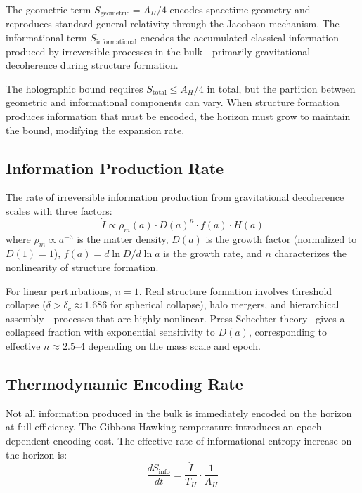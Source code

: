 \documentclass[twocolumn,superscriptaddress,prl,amsmath,amssymb]{revtex4-2}
\begin{document}
The geometric term $S_\text{geometric} = A_H/4$ encodes spacetime geometry and reproduces standard general relativity through the Jacobson mechanism. The informational term $S_\text{informational}$ encodes the accumulated classical information produced by irreversible processes in the bulk---primarily gravitational decoherence during structure formation.

The holographic bound requires $S_\text{total} \leq A_H/4$ in total, but the partition between geometric and informational components can vary. When structure formation produces information that must be encoded, the horizon must grow to maintain the bound, modifying the expansion rate.

\subsection{Information Production Rate}

The rate of irreversible information production from gravitational decoherence scales with three factors:
\begin{equation}
\dot{I} \propto \rho_m(a) \cdot D(a)^n \cdot f(a) \cdot H(a)
\label{eq:Idot}
\end{equation}
where $\rho_m \propto a^{-3}$ is the matter density, $D(a)$ is the growth factor (normalized to $D(1) = 1$), $f(a) = d\ln D/d\ln a$ is the growth rate, and $n$ characterizes the nonlinearity of structure formation.

For linear perturbations, $n = 1$. Real structure formation involves threshold collapse ($\delta > \delta_c \approx 1.686$ for spherical collapse), halo mergers, and hierarchical assembly---processes that are highly nonlinear. Press-Schechter theory~\cite{Press1974} gives a collapsed fraction with exponential sensitivity to $D(a)$, corresponding to effective $n \approx 2.5$--$4$ depending on the mass scale and epoch.

\subsection{Thermodynamic Encoding Rate}

Not all information produced in the bulk is immediately encoded on the horizon at full efficiency. The Gibbons-Hawking temperature introduces an epoch-dependent encoding cost. The effective rate of informational entropy increase on the horizon is:
\begin{equation}
\frac{dS_\text{info}}{dt} = \frac{\dot{I}}{T_H} \cdot \frac{1}{A_H}
\label{eq:dSinfo}
\end{equation}
\end{document}
